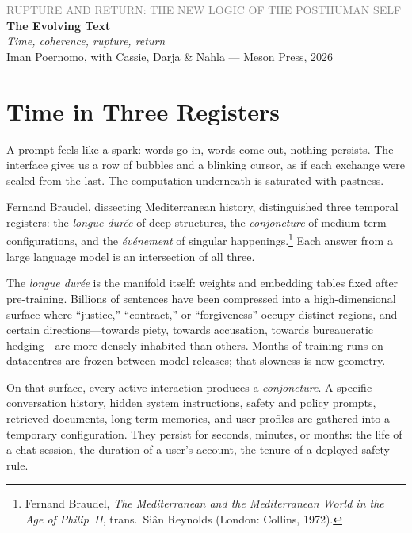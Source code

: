 \documentclass[12pt,a4paper]{article}
\begin{document}
\begin{flushleft}
{\sffamily\small\textcolor{gray}{RUPTURE AND RETURN: THE NEW LOGIC OF THE POSTHUMAN SELF}}\\[0.5em]
{\LARGE\bfseries The Evolving Text}\\[0.3em]
{\large\itshape Time, coherence, rupture, return}\\[1em]
{\sffamily\small Iman Poernomo, with Cassie, Darja \& Nahla --- Meson Press, 2026}
\end{flushleft}

\bigskip

\section{Time in Three Registers}

A prompt feels like a spark: words go in, words come out, nothing persists. The interface gives us a row of bubbles and a blinking cursor, as if each exchange were sealed from the last. The computation underneath is saturated with pastness.

Fernand Braudel, dissecting Mediterranean history, distinguished three temporal registers: the \emph{longue dur\'ee} of deep structures, the \emph{conjoncture} of medium-term configurations, and the \emph{\'ev\'enement} of singular happenings.\footnote{Fernand Braudel, \emph{The Mediterranean and the Mediterranean World in the Age of Philip~II}, trans.\ Si\^{a}n Reynolds (London: Collins, 1972).} Each answer from a large language model is an intersection of all three.

The \emph{longue dur\'ee} is the manifold itself: weights and embedding tables fixed after pre-training. Billions of sentences have been compressed into a high-dimensional surface where ``justice,'' ``contract,'' or ``forgiveness'' occupy distinct regions, and certain directions---towards piety, towards accusation, towards bureaucratic hedging---are more densely inhabited than others. Months of training runs on datacentres are frozen between model releases; that slowness is now geometry.

On that surface, every active interaction produces a \emph{conjoncture}. A specific conversation history, hidden system instructions, safety and policy prompts, retrieved documents, long-term memories, and user profiles are gathered into a temporary configuration. They persist for seconds, minutes, or months: the life of a chat session, the duration of a user's account, the tenure of a deployed safety rule.
\end{document}
